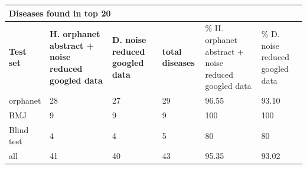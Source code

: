 \documentclass[10pt,letterpaper,two column,final]{article}
\begin{document}
\begin{center}
\begin{small}
\begin{tabular}{l|p{2.2cm}p{2.2cm}||p{1.2cm}p{2.2cm}p{2.2cm}}
	\multicolumn{6}{l}{\textbf{Diseases found in top 20}} \\ \hline
\textbf{Test set} & \textbf{H. orphanet abstract + noise reduced googled data} &	\textbf{D. noise reduced googled data}	 &	\textbf{total diseases} &	\% H. orphanet abstract + noise reduced googled data &\% D. noise reduced googled data \\ \hline
orphanet    &    28   &   27   & 29      & 96.55     & 93.10 \\
BMJ	        &    9   &    9  &    9   &   100   & 100 \\
Blind test	&    4   &    4  &    5   &    80  & 80 \\ \hline \hline
all	        &    41   &  40    &   43    &   95.35   & 93.02 \\ \hline
\end{tabular}
\end{small}
\end{center}
\end{document}
